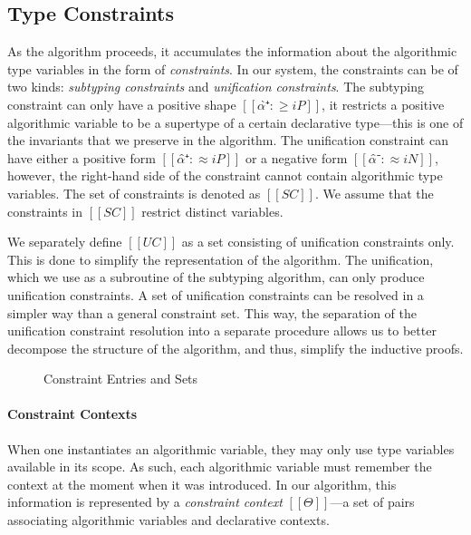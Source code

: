 \subsection{Type Constraints}
As the algorithm proceeds, it accumulates the information 
about the algorithmic type variables in the form of \emph{constraints}.
In our system, the constraints can be of two kinds: 
\emph{subtyping constraints} and \emph{unification constraints}.
The subtyping constraint can only have a positive shape $[[α̂⁺ :≥ iP]]$, \ie it 
restricts a positive algorithmic variable to be a 
supertype of a certain declarative type---this is one of the invariants that we 
preserve in the algorithm.
The unification constraint can have either a positive form $[[α̂⁺ :≈ iP]]$ or
a negative form $[[α̂⁻ :≈ iN]]$, however, the right-hand side of the constraint
cannot contain algorithmic type variables.
The set of constraints is denoted as $[[SC]]$. 
We assume that the constraints in $[[SC]]$ restrict distinct variables.

We separately define $[[UC]]$ as a set consisting of unification constraints only.
This is done to simplify the representation of the algorithm. 
The unification, which we use as a subroutine of the subtyping algorithm,
can only produce unification constraints.
A set of unification constraints can be resolved in a simpler way than
a general constraint set. This way, 
the separation of the unification constraint resolution into a separate
procedure allows us to better decompose the structure of the algorithm,
and thus, simplify the inductive proofs.


  \begin{figure}[h]
    \begin{multicols}{2}

    \columnbreak

    \end{multicols}

    \label{fig:syntax-e-sc}
    \caption{Constraint Entries and Sets}
  \end{figure}

\paragraph{Constraint Contexts}
When one instantiates an algorithmic variable, 
they may only use type variables available in its scope.
As such, each algorithmic variable must remember the context at the moment when 
it was introduced. In our algorithm, this information is represented by
a \emph{constraint context} $[[Θ]]$---a set of pairs associating 
algorithmic variables and declarative contexts.

